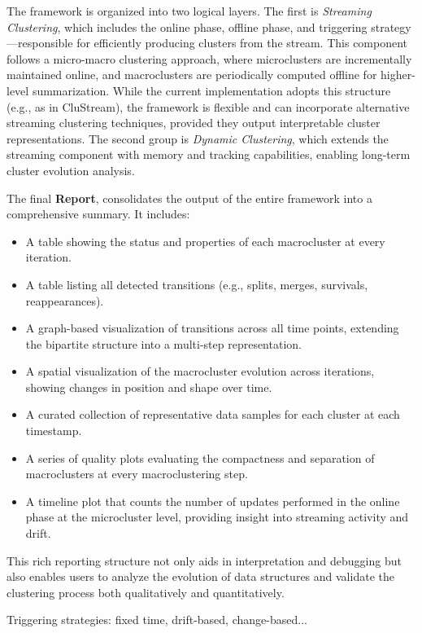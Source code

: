
The framework is organized into two logical layers.
The first is \textit{Streaming Clustering}, which includes the online phase,
offline phase, and triggering strategy—responsible for efficiently producing
clusters from the stream. This component follows a micro-macro clustering approach,
where microclusters are incrementally maintained online, and macroclusters are
periodically computed offline for higher-level summarization. While the current
implementation adopts this structure (e.g., as in CluStream), the framework is
flexible and can incorporate alternative streaming clustering techniques, provided
they output interpretable cluster representations. The second group is
\textit{Dynamic Clustering}, which extends the streaming component with memory
and tracking capabilities, enabling long-term cluster evolution analysis.

The final \textbf{Report}, consolidates the output of the entire framework into
a comprehensive summary. It includes:
\begin{itemize}
      \item A table showing the status and properties of each macrocluster at every
            iteration.
      \item A table listing all detected transitions (e.g., splits, merges, survivals,
            reappearances).
      \item A graph-based visualization of transitions across all time points, extending
            the bipartite structure into a multi-step representation.
      \item A spatial visualization of the macrocluster evolution across iterations,
            showing changes in position and shape over time.
      \item A curated collection of representative data samples for each cluster at each
            timestamp.
      \item A series of quality plots evaluating the compactness and separation of
            macroclusters at every macroclustering step.
      \item A timeline plot that counts the number of updates performed in the online phase
            at the microcluster level, providing insight into streaming activity and drift.
\end{itemize}

This rich reporting structure not only aids in interpretation and debugging but
also enables users to analyze the evolution of data structures and validate the
clustering process both qualitatively and quantitatively.

Triggering strategies: fixed time, drift-based, change-based...